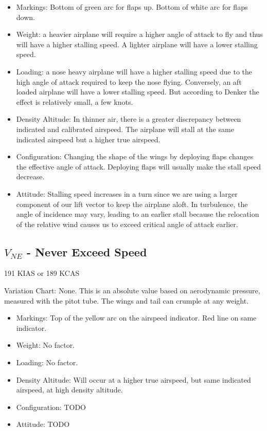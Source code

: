 \begin{itemize}
\item Markings: Bottom of green arc for flaps up. Bottom of white arc for flaps down.
\item Weight: a heavier airplane will require a higher angle of attack to fly and thus will have a higher stalling speed. A lighter airplane will have a lower stalling speed.
\item Loading: a nose heavy airplane will have a higher stalling speed due to the high angle of attack required to keep the nose flying. Conversely, an aft loaded airplane will have a lower stalling speed. But according to Denker the effect is relatively small, a few knots.
\item Density Altitude: In thinner air, there is a greater discrepancy between indicated and calibrated airspeed. The airplane will stall at the same indicated airspeed but a higher true airspeed.  
\item Configuration: Changing the shape of the wings by deploying flaps changes the effective angle of attack. Deploying flaps will usually make the stall speed decrease.
\item Attitude: Stalling speed increases in a turn since we are using a larger component of our lift vector to keep the airplane aloft. In turbulence, the angle of incidence may vary, leading to an earlier stall because the relocation of the relative wind causes us to exceed critical angle of attack earlier. 
\end{itemize}


\subsection{$V_{NE}$ - Never Exceed Speed}

191 KIAS or 189 KCAS

Variation Chart: None. This is an absolute value based on aerodynamic pressure, measured with the pitot tube. The wings and tail can crumple at any weight.

\begin{itemize}
\item Markings: Top of the yellow arc on the airspeed indicator. Red line on same indicator.
\item Weight: No factor.
\item Loading: No factor.
\item Density Altitude: Will occur at a higher true airspeed, but same indicated airspeed, at high density altitude.
\item Configuration: TODO
\item Attitude: TODO
\end{itemize}

